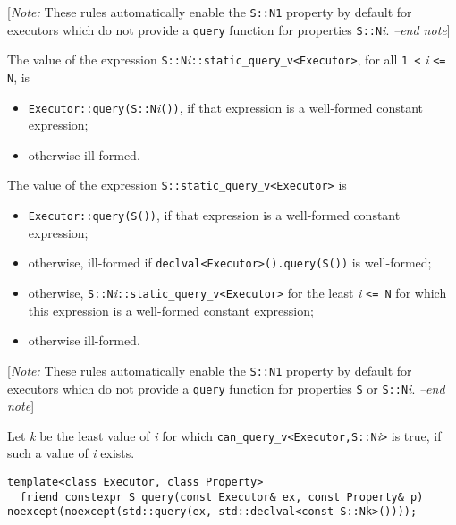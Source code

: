 \documentclass[a4paper,12pt,notitlepage,twoside,openright]{article}
\begin{document}
{[}\emph{Note:} These rules automatically enable the
\texttt{S::N1} property by default for executors which do
not provide a \texttt{query} function for properties
\texttt{S::N}\emph{i}. \emph{--end note}{]}

The value of the expression
\texttt{S::N}\emph{i}\texttt{::static_query_v<Executor>},
for all \texttt{1 <} \emph{i} \texttt{<= N}, is

\begin{itemize}

\item
  \texttt{Executor::query(S::N}\emph{i}\texttt{())},
  if that expression is a well-formed constant expression;
\item
  otherwise ill-formed.
\end{itemize}

The value of the expression
\texttt{S::static_query_v<Executor>} is

\begin{itemize}

\item
  \texttt{Executor::query(S())}, if that expression is a
  well-formed constant expression;
\item
  otherwise, ill-formed if
  \texttt{declval<Executor>().query(S())} is well-formed;
\item
  otherwise,
  \texttt{S::N}\emph{i}\texttt{::static_query_v<Executor>}
  for the least \emph{i} \texttt{<= N} for which this
  expression is a well-formed constant expression;
\item
  otherwise ill-formed.
\end{itemize}

{[}\emph{Note:} These rules automatically enable the
\texttt{S::N1} property by default for executors which do
not provide a \texttt{query} function for properties
\texttt{S} or \texttt{S::N}\emph{i}. \emph{--end
note}{]}

Let \emph{k} be the least value of \emph{i} for which
\texttt{can_query_v<Executor,S::N}\emph{i}\texttt{>}
is true, if such a value of \emph{i} exists.

\begin{verbatim}
template<class Executor, class Property>
  friend constexpr S query(const Executor& ex, const Property& p) noexcept(noexcept(std::query(ex, std::declval<const S::Nk>())));
\end{verbatim}
\end{document}
